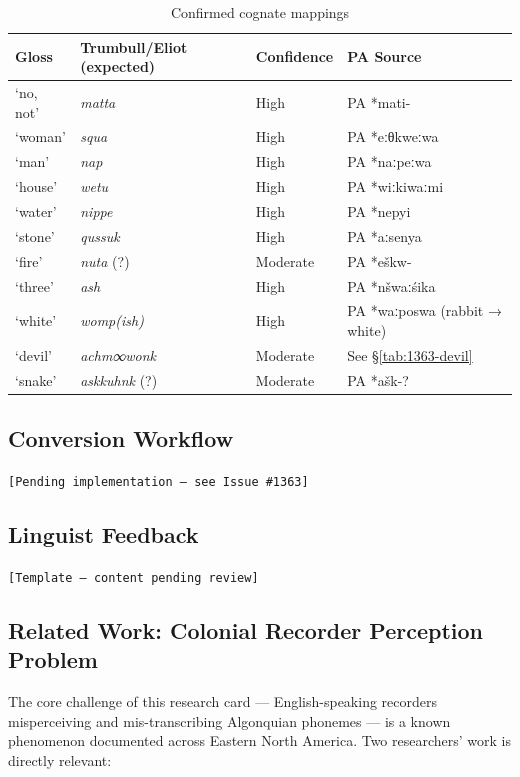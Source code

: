 \begin{table}[h]
\centering
\begin{tabular}{llll}
\toprule
Gloss & Trumbull/Eliot (expected) & Confidence & PA Source \\
\midrule
`no, not' & \textit{matta} & High & PA *mati- \\
`woman' & \textit{squa} & High & PA *eːθkweːwa \\
`man' & \textit{nap} & High & PA *naːpeːwa \\
`house' & \textit{wetu} & High & PA *wiːkiwaːmi \\
`water' & \textit{nippe} & High & PA *nepyi \\
`stone' & \textit{qussuk} & High & PA *aːsenya \\
`fire' & \textit{nuta} (?) & Moderate & PA *eškw- \\
`three' & \textit{ash} & High & PA *nšwaːśika \\
`white' & \textit{womp(ish)} & High & PA *waːposwa (rabbit → white) \\
`devil' & \textit{achm∞wonk} & Moderate & See §\ref{tab:1363-devil} \\
`snake' & \textit{askkuhnk} (?) & Moderate & PA *ašk-? \\
\bottomrule
\end{tabular}
\caption{Confirmed cognate mappings}
\label{tab:1363-cognates}
\end{table}

\subsection{Conversion Workflow}
\texttt{[Pending implementation --- see Issue \#1363]}

\subsection{Linguist Feedback}
\texttt{[Template --- content pending review]}

\subsection{Related Work: Colonial Recorder Perception Problem}

The core challenge of this research card --- English-speaking recorders
misperceiving and mis-transcribing Algonquian phonemes --- is a known
phenomenon documented across Eastern North America. Two researchers' work is
directly relevant:


